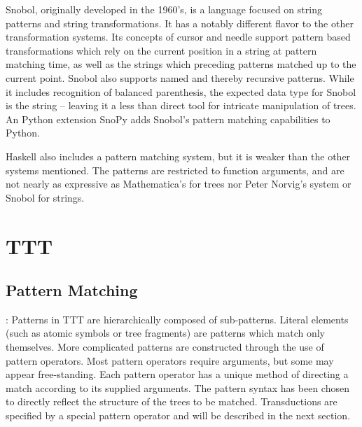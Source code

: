 \documentclass[11pt]{article}
\begin{document}
Snobol, originally developed in the 1960's, is a language focused on string patterns and string transformations.  It has a notably different flavor to the other transformation systems. Its concepts of cursor and needle support pattern based transformations which rely on the current position in a string at pattern matching time, as well as the strings which preceding patterns matched up to the current point.  Snobol also supports named and thereby recursive patterns.  While it includes recognition of balanced parenthesis, the expected data type for Snobol is the string -- leaving it a less than direct tool for intricate manipulation of trees.  An Python extension SnoPy adds Snobol's pattern matching capabilities to Python.  \cite{SnoPy,Greenbook}

Haskell also includes a pattern matching system, but it is weaker than the other systems mentioned.  The patterns are restricted to function arguments, and are not nearly as expressive as Mathematica's for trees nor Peter Norvig's system or Snobol for strings. \cite{Haskellorg}


\section{TTT}
\subsection*{Pattern Matching}:
Patterns in TTT are hierarchically composed of sub-patterns.  Literal elements (such as atomic symbols or tree fragments) are patterns which match only themselves.  More complicated patterns are constructed through the use of pattern operators.   Most pattern operators require arguments, but some may appear free-standing.  Each pattern operator has a unique method of directing a match according to its supplied arguments.  The pattern syntax has been chosen to directly reflect the structure of the trees to be matched. Transductions are specified by a special pattern operator and will be described in the next section.
\end{document}
